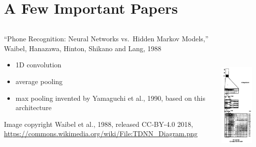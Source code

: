 \documentclass{beamer}
\begin{document}
\section[Papers]{A Few Important Papers}
\setcounter{subsection}{1}

\begin{frame}
  \begin{columns}
    \column{2in}
    \begin{block}{``Phone Recognition: Neural Networks vs.~Hidden Markov Models,'' Waibel, Hanazawa,
        Hinton, Shikano and Lang, 1988}
      \begin{itemize}
      \item 1D convolution
      \item average pooling
      \item max pooling invented by Yamaguchi et  al., 1990, based on this architecture
      \end{itemize}
      \begin{tiny}
        {
          Image copyright Waibel et al., 1988, released CC-BY-4.0 2018,
          \url{https://commons.wikimedia.org/wiki/File:TDNN_Diagram.png}
          
        }
      \end{tiny}
    \end{block}
    \column{2in}
    \begin{block}{}
      \centerline{\includegraphics[height=3in]{figs/waibel1989.png}}
    \end{block}
  \end{columns}
\end{frame}
\end{document}
